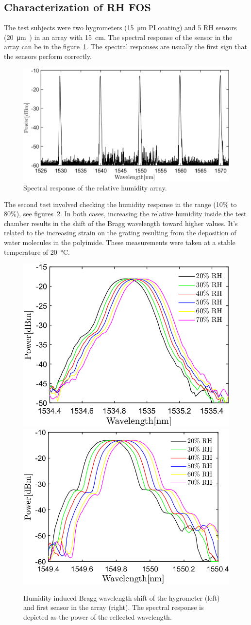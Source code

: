 \subsection{Characterization of RH FOS}
The test subjects were two hygrometers (\SI{15}{\micro\metre} PI coating) and  5 \gls{RH} sensors (\SI{20}{\micro\metre)} in an array with \SI{15}{\cm}. The spectral response of the sensor in the array can be in the figure~\ref{fig_array_wavelength}. The spectral responses are usually the first sign that the sensors perform correctly. 
\begin{figure}[!h]
\centering
\includegraphics[width=0.85\columnwidth]{Chapter5/images/rh_array.png}
\caption{Spectral response of the relative humidity array.}
\label{fig_array_wavelength}
\end{figure}
The second test involved checking the humidity response in the range (10\% to 80\%), see figures~\ref{fig_response}. In both cases, increasing the relative humidity inside the test chamber results in the shift of the Bragg wavelength toward higher values. It's related to the increasing strain on the grating resulting from the deposition of water molecules in the polyimide. These measurements were taken at a stable temperature of \SI{20}{\celsius}.
\begin{figure}[!h]
\centering
\includegraphics[width=0.45\columnwidth]{Chapter5/images/rh.png}
\includegraphics[width=0.47\columnwidth]{Chapter5/images/rh_array2.png}
\caption{Humidity induced Bragg wavelength shift of the hygrometer (left) and first sensor in the array (right). The spectral response is depicted as the power of the reflected wavelength. }
\label{fig_response}
\end{figure}
